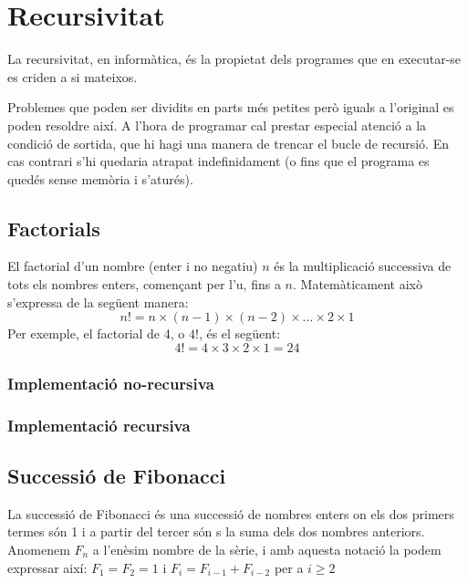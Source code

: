 \chapter{Recursivitat}

La recursivitat, en informàtica, és la propietat dels programes que en executar-se es criden a si mateixos.

Problemes que poden ser dividits en parts més petites però iguals a l'original es poden resoldre així.
A l'hora de programar cal prestar especial atenció a la condició de sortida, que hi hagi una manera de trencar el bucle de recursió. En cas contrari s'hi quedaria atrapat indefinidament (o fins que el programa es quedés sense memòria i s'aturés).

\section{Factorials}
El factorial d'un nombre (enter i no negatiu) $n$ és la multiplicació successiva de tots els nombres enters, començant per l'u, fins a $n$.
Matemàticament això s'expressa de la següent manera:
\begin{equation*}
	n! = n \times (n-1) \times (n-2) \times \ldots \times 2 \times 1 
\end{equation*}
Per exemple, el factorial de 4, o $4!$, és el següent:
\begin{equation*}
	4! = 4 \times 3 \times 2 \times 1 = 24 
\end{equation*}

\subsection{Implementació no-recursiva}


\subsection{Implementació recursiva}


\section{Successió de Fibonacci}
La successió de Fibonacci és una successió de nombres enters on els dos primers termes són 1 i a partir del tercer són s la suma dels dos nombres anteriors.
Anomenem $F_n$ a l'enèsim nombre de la sèrie, i amb aquesta notació la podem expressar així: $F_1=F_2=1$ i $F_i=F_{i-1}+F_{i-2}$ per a $i \geq 2$

